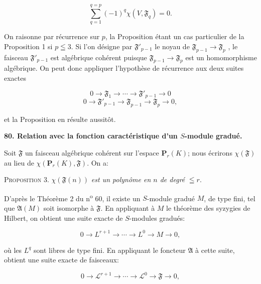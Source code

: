 \begin{equation*}
\sum_{q=1}^{q=p} (-1)^q \chi(V, \mathfrak{F}_q) = 0.
\end{equation*}

On raisonne par récurrence sur $p$, la Proposition étant un cas particulier de la Proposition 1 si $p \leqq 3$. Si l'on désigne par $\mathfrak{F}'_{p-1}$ le noyau de $\mathfrak{F}_{p-1} \rightarrow \mathfrak{F}_p$ , le faisceau $\mathfrak{F}'_{p-1}$ est algébrique cohérent puisque $\mathfrak{F}_{p-1} \rightarrow \mathfrak{F}_p$ est un homomorphisme algébrique. On peut donc appliquer l'hypothèse de récurrence aux deux suites exactes

\begin{equation*}
0 \rightarrow \mathfrak{F}_1 \rightarrow \cdots \rightarrow \mathfrak{F}'_{p-1} \rightarrow 0
\end{equation*}
\begin{equation*}
0 \rightarrow \mathfrak{F}'_{p-1} \rightarrow \mathfrak{F}_{p-1} \rightarrow \mathfrak{F}_p \rightarrow 0,
\end{equation*}

et la Proposition en résulte aussitôt.

\textbf{80. Relation avec la fonction caractéristique d'un $S$-module gradué.}

Soit $\mathfrak{F}$ un faisceau algébrique cohérent sur l'espace $\mathbf{P}_r(K)$; nous écrirons $\chi(\mathfrak{F})$ au lieu de $\chi(\mathbf{P}_r(K), \mathfrak{F})$. On a:

\textsc{Proposition} 3. $\chi(\mathfrak{F}(n))$ \textit{est un polynôme en $n$ de degré} $\leqq r$.

D'après le Théorème 2 du n\textsuperscript{o} 60, il existe un $S$-module gradué $M$, de type fini, tel que $\mathfrak{A}(M)$ soit isomorphe à $\mathfrak{F}$. En appliquant à $M$ le théorème des syzygies de Hilbert, on obtient une suite exacte de $S$-modules gradués:

\begin{equation*}
0 \rightarrow L^{r+1} \rightarrow \cdots \rightarrow L^0 \rightarrow M \rightarrow 0,
\end{equation*}

où les $L^q$ sont libres de type fini. En appliquant le foncteur $\mathfrak{A}$ à cette suite, obtient une suite exacte de faisceaux:

\begin{equation*}
0 \rightarrow \mathcal{L}^{r+1} \rightarrow \cdots \rightarrow \mathcal{L}^0 \rightarrow \mathfrak{F} \rightarrow 0,
\end{equation*}


